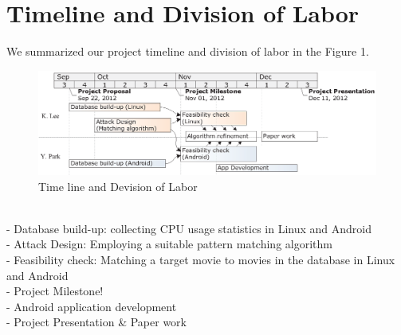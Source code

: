 \section{Timeline and Division of Labor}
\label{sec:timeline}
We summarized our project timeline and division of labor in the Figure 1. \\
\begin{figure}[!ht]
\centering
\includegraphics[scale=1]{Timeline}
\caption{Time line and Devision of Labor}
\end{figure}\\
- Database build-up: collecting CPU usage statistics in Linux and Android\\
- Attack Design: Employing a suitable pattern matching algorithm\\
- Feasibility check: Matching a target movie to movies in the database in Linux and Android \\
- Project Milestone!\\
- Android application development\\
- Project Presentation \& Paper work
